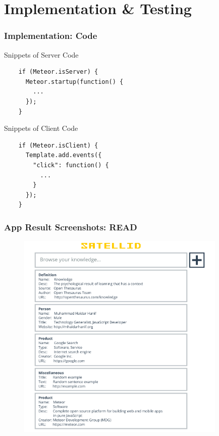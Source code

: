 \documentclass[10pt, compress]{beamer}
\begin{document}

\section{Implementation \& Testing}


\begin{frame}[fragile]
  \frametitle{Implementation: Code}

  Snippets of Server Code
  \begin{verbatim}
    if (Meteor.isServer) {
      Meteor.startup(function() {
        ...
      });
    }
  \end{verbatim}

  Snippets of Client Code
  \begin{verbatim}
    if (Meteor.isClient) {
      Template.add.events({
        "click": function() {
          ...
        }
      });
    }
  \end{verbatim}

\end{frame}


\begin{frame}[fragile]
  \frametitle{App Result Screenshots: READ}

  \begin{figure}[ht]
    \centering
    \vspace{-1cm}
    \includegraphics[height=10cm]{include/satellid-app-results_read.png}
    \vspace{-10pt}
    \label{fig:satellid-app-results_read}
  \end{figure}

\end{frame}
\end{document}

